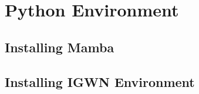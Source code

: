 \section{Python Environment}
\subsection{Installing Mamba}

\subsection{Installing IGWN Environment}
